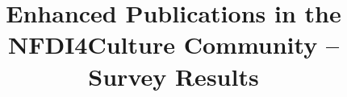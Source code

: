 \documentclass{article}
\begin{document}
\title{Enhanced Publications in the NFDI4Culture Community – Survey Results}

\maketitle
\end{document}

